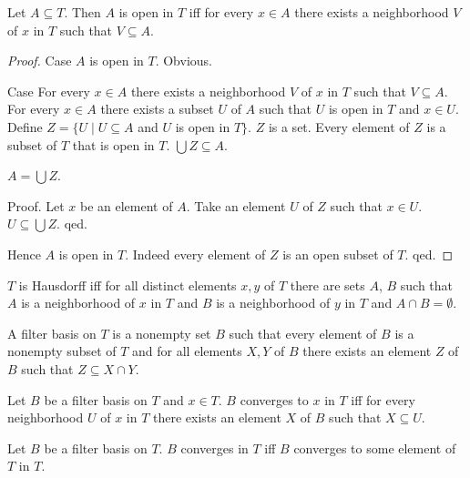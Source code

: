 \documentclass[11pt]{article}
\begin{document}
\begin{forthel}

\begin{lemma} Let $A \subseteq T$. Then $A$ is open in $T$ iff
for every $x \in A$ there exists a neighborhood $V$ of
$x$ in $T$ such that $V \subseteq A$.
\end{lemma}

\begin{proof}
Case $A$ is open in $T$. Obvious.

Case For every $x \in A$ there exists a neighborhood $V$ of
$x$ in $T$ such that $V \subseteq A$.
For every $x \in A$ there exists a subset $U$ of $A$ such
that $U$ is open in $T$ and $x \in U$.
Define $Z = \{U \mid U \subseteq A$ and $U$ is open in $T\}$.
$Z$ is a set.
Every element of $Z$ is a subset
of $T$ that is open in $T$.
$\bigcup Z \subseteq A$.

$A = \bigcup Z$. 

Proof. Let $x$ be an element of $A$. Take
an element $U$ of $Z$ such that
$x \in U$. $U \subseteq \bigcup Z$.
qed.

Hence $A$ is open in $T$. Indeed every element of $Z$ is an open subset of $T$.
qed.
\end{proof}

\begin{definition} $T$ is Hausdorff iff for all distinct elements
$x,y$ of $T$ 
there are sets $A$, $B$ such that $A$ is a neighborhood of $x$ in $T$ 
and $B$ is a neighborhood of $y$ in $T$ and
$A \cap B = \emptyset$.
\end{definition}

\begin{definition}
A filter basis on $T$ is a nonempty set $B$ such that
every element of $B$ is a nonempty subset of $T$ and
for all elements $X,Y$ of $B$ there exists an element $Z$ of $B$
such that  $Z \subseteq X \cap Y$.
\end{definition}

\begin{definition}
Let $B$ be a filter basis on $T$ and $x \in T$.
$B$ converges to $x$ in $T$ iff for every 
neighborhood $U$ of $x$ in $T$ 
there exists an element $X$ of $B$ such that $X \subseteq U$.
\end{definition}

\begin{definition}
Let $B$ be a filter basis on $T$.
$B$ converges in $T$ iff 
$B$ converges to some element of $T$ in $T$.
\end{definition}


\end{forthel}
\end{document}
